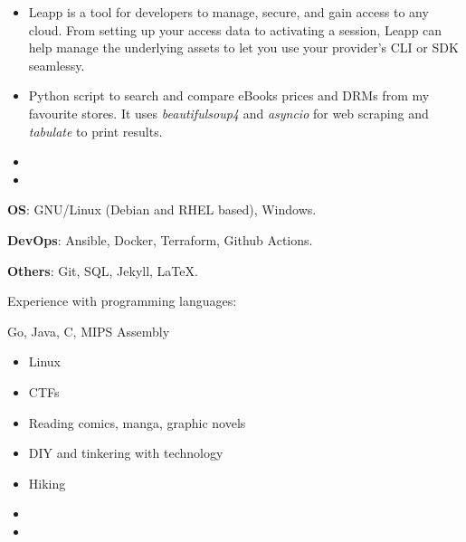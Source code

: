 \begin{itemize}
\item Leapp is a tool for developers to manage, secure, and gain access to any cloud. From setting up your access data to activating a session, Leapp can help manage the underlying assets to let you use your provider's CLI or SDK seamlessy.
\end{itemize}
\smallskip
\smallskip
{}
\begin{itemize}
\item Python script to search and compare eBooks prices and DRMs from my favourite stores. It uses \textit{beautifulsoup4} and \textit{asyncio} for web scraping and \textit{tabulate} to print results.
\end{itemize}
\smallskip
\smallskip

\begin{itemize}
 \item {}
 \item {}
\end{itemize}
\smallskip
\begin{description}
 \item \textbf{OS}: GNU/Linux (Debian and RHEL based), Windows.
 \item \textbf{DevOps}: Ansible, Docker, Terraform, Github Actions.
 \item \textbf{Others}: Git, SQL, Jekyll, LaTeX.
 \item Experience with programming languages: 
 \item    Go, Java, C, MIPS Assembly
\end{description}

\begin{itemize}
\item Linux
\item CTFs
\end{itemize}
\smallskip
{}
\begin{itemize}
\item Reading comics, manga, graphic novels
\item DIY and tinkering with technology
\item Hiking
\end{itemize}


\begin{itemize}
 \item {}
 \item {}
\end{itemize}

